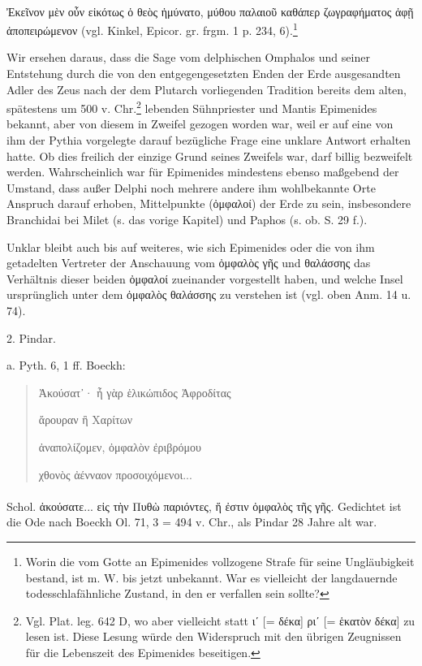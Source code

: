 \documentclass[a4paper, 11pt, oneside]{article}
\begin{document}
\paragraph{}
Ἐκεῖνον μὲν οὖν εἰκότως ὁ θεὸς ἠμύνατο, μύθου παλαιοῦ καθάπερ ζωγραφήματος ἁφῇ ἀποπειρώμενον (vgl. Kinkel, Epicor. gr. frgm. 1 p. 234, 6).\footnote{Worin die vom Gotte an Epimenides vollzogene Strafe für seine Ungläubigkeit bestand, ist m. W. bis jetzt unbekannt. War es vielleicht der langdauernde todesschlafähnliche Zustand, in den er verfallen sein sollte?}

Wir ersehen daraus, dass die Sage vom delphischen Omphalos und seiner Entstehung durch die von den entgegengesetzten Enden der Erde ausgesandten Adler des Zeus nach der dem Plutarch vorliegenden Tradition bereits dem alten, spätestens um 500 v. Chr.\footnote{Vgl. Plat. leg. 642 D, wo aber vielleicht statt ιʹ [= δέκα] ριʹ [= ἑκατὸν δέκα] zu lesen ist. Diese Lesung würde den Widerspruch mit den übrigen Zeugnissen für die Lebenszeit des Epimenides beseitigen.} lebenden Sühnpriester und Mantis Epimenides bekannt, aber von diesem in Zweifel gezogen worden war, weil er auf eine von ihm der Pythia vorgelegte darauf bezügliche Frage eine unklare Antwort erhalten hatte. Ob dies freilich der einzige Grund seines Zweifels war, darf billig bezweifelt werden. Wahrscheinlich war für Epimenides mindestens ebenso maßgebend der Umstand, dass außer Delphi noch mehrere andere ihm wohlbekannte Orte Anspruch darauf erhoben, Mittelpunkte (ὀμφαλοί) der Erde zu sein, insbesondere Branchidai bei Milet (s. das vorige Kapitel) und Paphos (s. ob. S. 29 f.).

Unklar bleibt auch bis auf weiteres, wie sich Epimenides oder die von ihm getadelten Vertreter der Anschauung vom ὀμφαλὸς γῆς und θαλάσσης das Verhältnis dieser beiden ὀμφαλοί zueinander vorgestellt haben, und welche Insel ursprünglich unter dem ὀμφαλὸς θαλάσσης zu verstehen ist (vgl. oben Anm. 14 u. 74).

2. Pindar.

a. Pyth. 6, 1 ff. Boeckh:
\begin{quotation}
Ἀκούσατ᾽· ἦ γὰρ ἑλικώπιδος Ἀφροδίτας

ἄρουραν ἢ Χαρίτων

ἀναπολίζομεν, ὀμφαλὸν ἐριβρόμου

χθονὸς ἀένναον προσοιχόμενοι...
\end{quotation}
\paragraph{}
Schol. ἀκούσατε... εἰς τὴν Πυθὼ παριόντες, ἥ ἐστιν ὀμφαλὸς τῆς γῆς. Gedichtet ist die Ode nach Boeckh Ol. 71, 3 = 494 v. Chr., als Pindar 28 Jahre alt war.
\end{document}
